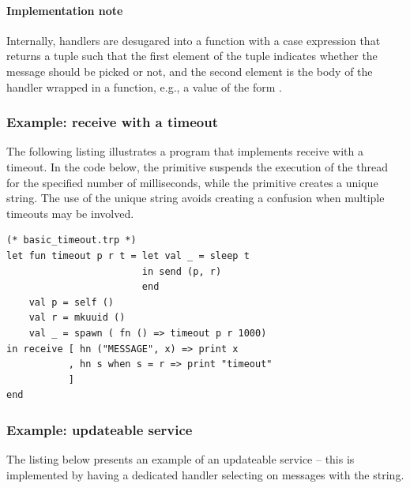 \paragraph{Implementation note} 
Internally, handlers are desugared into a function with a case expression that returns a tuple such that the first 
element of the tuple indicates whether the message should be picked or not, and the second element is the body 
of the handler wrapped in a function, e.g., a value of the form .


\subsubsection{Example: receive with a timeout}
The following listing illustrates a program that implements
receive with a timeout. In the code below, the primitive 
suspends the execution of the thread for the specified number of milliseconds,
while the primitive  creates a unique string.
The use of the unique string avoids creating a confusion when multiple
timeouts may be involved.
\begin{lstlisting}
(* basic_timeout.trp *)
let fun timeout p r t = let val _ = sleep t
                        in send (p, r)
                        end
    val p = self () 
    val r = mkuuid () 
    val _ = spawn ( fn () => timeout p r 1000)    
in receive [ hn ("MESSAGE", x) => print x
           , hn s when s = r => print "timeout" 
           ]
end	
\end{lstlisting}

\subsubsection{Example: updateable service}
The listing below presents an example of an updateable service -- 
this is implemented by having a dedicated handler selecting on 
messages with the  string.

